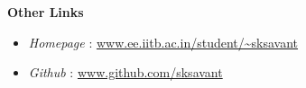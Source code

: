 \documentclass[a4paper,11pt]{article}
\newcommand{\resheading}[1]{{\small \colorbox{mygrey}{\begin{minipage}{0.975\textwidth}{\textbf{#1 \vphantom{p\^{E}}}}\end{minipage}}}}
\begin{document}
\begin{comment}
\hline
Engineering Drawing  &9 & Workshop Practice   &9 \\
\hline
Chemistry Lab  &10 & Physics Lab  &8 \\
\hline
\multicolumn{4}{|c|}{\bfseries Sciences and Humanities}\\
\hline
Electricity and Magnetism &9  & Chemistry  &8 \\
\hline
Economics  &8 & Psychology  &NA \\
\hline
\end{tabular}}\\
\\
{\small The courses marked with NA shall be covered in the academic
year 2012-13}
\end{comment}

\resheading{\large{\textbf{Other Links}}}
    \begin{itemize}
        \item \emph{Homepage} : \href{http://www.ee.iitb.ac.in/student/\~sksavant}{www.ee.iitb.ac.in/student/\textasciitilde{}sksavant}
        \item \emph{Github} : \href{http://www.github.com/sksavant}{www.github.com/sksavant}
    \end{itemize}
\end{document}

